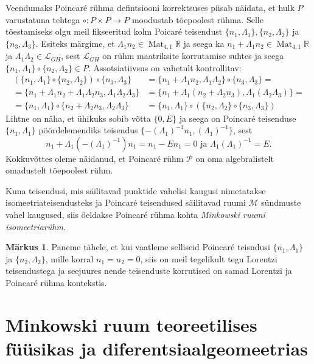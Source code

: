 \documentclass[12pt,a4paper,oneside]{article}
\theoremstyle{plain}
\theoremstyle{definition}
\newtheorem{markus}{Märkus}[section]
\numberwithin{equation}{section}
\def\R{{\mathbb R}}
\def\L{{\mathcal L}}
\def\M{{\mathcal M}}
\def\P{{\mathcal P}}
\DeclareMathOperator{\Mat}{Mat}
\begin{document}
Veendumaks Poincar\'e rühma defintsiooni korrektsuses piisab 
näidata, et hulk $P$ varustatuna tehtega 
$\circ : P \times P \rightarrow P$ moodustab tõepoolest rühma.
Selle tõestamiseks olgu meil fikseeritud kolm Poicar\'e teisendust 
$\{n_1, \Lambda_1\}, \{n_2, \Lambda_2\}$ ja $\{n_3, \Lambda_3\}$. 
Esiteks märgime, et $ \Lambda_1 n_2 \in \Mat_{4, 1}\R$ ja seega ka 
$n_1 + \Lambda_1 n_2 \in \Mat_{4, 1}\R$ ja $\Lambda_1 \Lambda_2 \in 
\L_{GH}$, sest $\L_{GH}$ on rühm maatriksite korrutamise suhtes ja 
seega $\{n_1, \Lambda_1\} \circ \{n_2, \Lambda_2\} \in P$.
Assotsiatiivsus on vahetult kontrollitav:
\begin{align*}
\left(\{n_1, \Lambda_1\} \circ \{n_2, \Lambda_2\}\right) \circ 
\{n_3, \Lambda_3\} &= \{n_1 + \Lambda_1 n_2, \Lambda_1 \Lambda_2 \} 
\circ \{n_3, \Lambda_3 \} = \\
= \{n_1 + \Lambda_1 n_2 + \Lambda_1 \Lambda_2 n_3, \Lambda_1 
\Lambda_2 \Lambda_3 \} &= \{n_1 + \Lambda_1 \left( n_2 + 
\Lambda_2 n_3 \right), \Lambda_1 \left( \Lambda_2 
\Lambda_3 \right)\} = \\
= \{n_1, \Lambda_1 \} \circ \{n_2 + \Lambda_2 n_3, \Lambda_2 
\Lambda_3 \} &= \{n_1, \Lambda_1\} \circ \left( \{n_2, \Lambda_2\} 
\circ \{n_3, \Lambda_3\} \right)
\end{align*}
Lihtne on näha, et ühikuks sobib võtta $\{0, E\}$ ja seega on 
Poincar\'e teisenduse $\{n_1, \Lambda_1\}$ pöördelemendiks 
teisendus $\{ -\left(\Lambda_1\right)^{-1} n_1, 
\left(\Lambda_1\right)^{-1} \}$, sest
\[ n_1 + \Lambda_1 \left(-\left(\Lambda_1\right)^{-1}\right) n_1 = 
n_1 - E n_1 = 0 \text{ ja } 
\Lambda_1 \left(\Lambda_1\right)^{-1} = E. \]
Kokkuvõttes oleme näidanud, et Poincar\'e rühm $\P$ on oma 
algebralistelt omadustelt tõepoolest rühm.

Kuna teisendusi, mis säilitavad punktide vahelisi kaugusi 
nimetatakse isomeetriateisendusteks ja Poincar\'e teisendused 
säilitavad ruumi $\M$ sündmuste vahel kaugused, siis öeldakse 
Poincar\'e rühma kohta \emph{Minkowski ruumi isomeetriarühm}.

\begin{markus}
Paneme tähele, et kui vaatleme selliseid Poincar\'e teisndusi 
$\{n_1, \Lambda_1\}$ ja $\{n_2, \Lambda_2\}$, mille korral $n_1 = 
n_2 = 0$, siis on meil tegelikult tegu Lorentzi teisendustega ja 
seejuures nende teisenduste korrutised on samad Lorentzi ja 
Poincar\'e rühma kontekstis.
\end{markus}

\newpage
\section{Minkowski ruum teoreetilises füüsikas ja diferentsiaalgeomeetrias}
\end{document}

